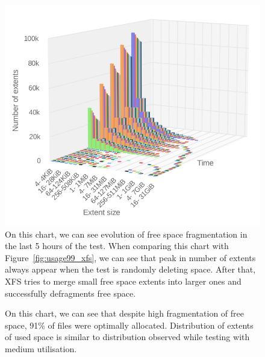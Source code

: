 \documentclass[
  color, %
  table, %
  lof,   %
  lot,   %
]{fithesis3}
\begin{document}
\begin{figure}[h]
    \centering
    \includegraphics[width=\textwidth,keepaspectratio]{../charts/HDD_xfs/free99.png}
    \caption[Evolution of free space fragmentation of XFS during testing of high utilisation of HDD]{On this chart, we can see evolution of free space fragmentation in the last 5 hours of the test. When comparing this chart with Figure~\ref{fig:usage99_xfs}, we can see that peak in number of extents always appear when the test is randomly deleting space. After that, XFS tries to merge small free space extents into larger ones and successfully defragments free space.}
    \label{fig:free99_xfs}
\end{figure}

\begin{figure}[h]
    \centering
    \caption[Size distribution of file extents of XFS during testing high utilisation of HDD]{On this chart, we can see that despite high fragmentation of free space, 91\% of files were optimally allocated. Distribution of extents of used space is similar to distribution observed while testing with medium utilisation.}
    \label{fig:used99_xfs}
\end{figure}
\end{document}
